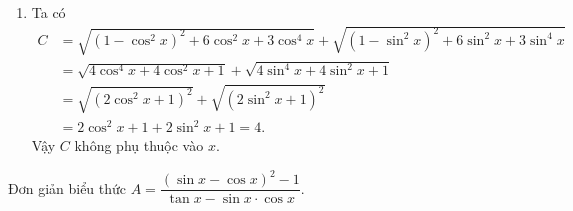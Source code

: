 \begin{ex}
{\begin{enumerate}
			 Vậy $B$ không phụ thuộc vào $x$.
			\item Ta có 
			\begin{align*}
				C&=\sqrt{\left(1-\cos ^2x\right)^2+6\cos ^2x+3\cos ^4x}+\sqrt{\left(1-\sin  ^2x\right)^2+6\sin ^2x+3\sin ^4x}\\
				&=\sqrt{4\cos ^4x+4\cos  ^2x+1}+\sqrt{4\sin ^4x+4\sin ^2x+1}\\
				&=\sqrt{\left(2\cos  ^2x+1\right)^2}+\sqrt{\left(2\sin ^2x+1\right)^2}\\
				&=2\cos ^2x+1+2\sin  ^2x+1=4.
			\end{align*}
			Vậy $C$ không phụ thuộc  vào $x$.
		\end{enumerate}
	 }
\end{ex}

\begin{ex}%
	Đơn  giản biểu thức $A=\dfrac{\left(\sin x-\cos x\right)^2-1}{\tan x-\sin x\cdot \cos x}$.
\end{ex}

